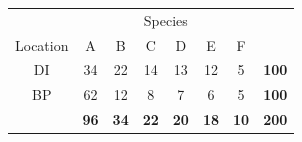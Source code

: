 \documentclass[10pt,openany]{book}\usepackage[]{graphicx}\usepackage[]{color}
\begin{document}
\begin{center}
  \begin{tabular}{c|c|c|c|c|c|c|c|}
    \multicolumn{1}{c}{} & \multicolumn{6}{c}{Species} & \multicolumn{1}{c}{} \\
    \cline{2-7}
    Location & A & B & C & D & E & F & \multicolumn{1}{c}{} \\
    \hline
    \multicolumn{1}{|c|}{DI} & 34 & 22 & 14 & 13 & 12 & 5 & \textbf{100} \\
    \hline
    \multicolumn{1}{|c|}{BP} & 62 & 12 & 8 & 7 & 6 & 5 & \textbf{100} \\
    \hline
    & \textbf{96} & \textbf{34} & \textbf{22} & \textbf{20} & \textbf{18} & \textbf{10} & \textbf{200} \\
    \cline{2-8}
  \end{tabular}
\end{center}
\end{document}
